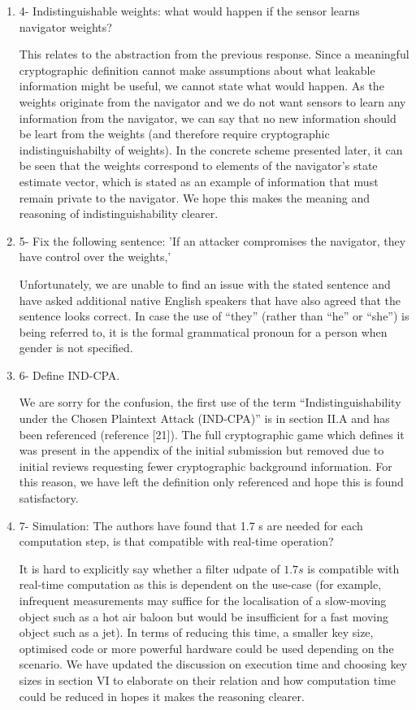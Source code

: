 \documentclass[a4paper]{scrartcl}
\newenvironment{rebuttal}{\begin{enumerate}[label={\color{grey}\thesection.\arabic{enumi}},leftmargin=0pt,ref=\thesection.\arabic{enumi}]}{\end{enumerate}}
\newcommand{\reviewtext}[1]{{\color{nblue} #1}}
\begin{document}
\begin{rebuttal}
\item \reviewtext{4- Indistinguishable weights: what would happen if the sensor learns navigator weights?}

This relates to the abstraction from the previous response. Since a meaningful cryptographic definition cannot make assumptions about what leakable information might be useful, we cannot state what would happen. As the weights originate from the navigator and we do not want sensors to learn any information from the navigator, we can say that no new information should be leart from the weights (and therefore require cryptographic indistinguishabilty of weights). In the concrete scheme presented later, it can be seen that the weights correspond to elements of the navigator's state estimate vector, which is stated as an example of information that must remain private to the navigator. We hope this makes the meaning and reasoning of indistinguishability clearer.

\item \reviewtext{5- Fix the following sentence: 'If an attacker compromises the navigator, they have control over the weights,'}

Unfortunately, we are unable to find an issue with the stated sentence and have asked additional native English speakers that have also agreed that the sentence looks correct. In case the use of ``they'' (rather than ``he'' or ``she'') is being referred to, it is the formal grammatical pronoun for a person when gender is not specified.

\item \reviewtext{6- Define IND-CPA.}

We are sorry for the confusion, the first use of the term ``Indistinguishability under the Chosen Plaintext Attack (IND-CPA)'' is in section II.A and has been referenced (reference [21]). The full cryptographic game which defines it was present in the appendix of the initial submission but removed due to initial reviews requesting fewer cryptographic background information. For this reason, we have left the definition only referenced and hope this is found satisfactory.

\item \reviewtext{7- Simulation: The authors have found that 1.7 s are needed for each
computation step, is that compatible with real-time operation?}

It is hard to explicitly say whether a filter udpate of $1.7s$ is compatible with real-time computation as this is dependent on the use-case (for example, infrequent measurements may suffice for the localisation of a slow-moving object such as a hot air baloon but would be insufficient for a fast moving object such as a jet). In terms of reducing this time, a smaller key size, optimised code or more powerful hardware could be used depending on the scenario. We have updated the discussion on execution time and choosing key sizes in section VI to elaborate on their relation and how computation time could be reduced in hopes it makes the reasoning clearer.


\end{rebuttal}
\end{document}
